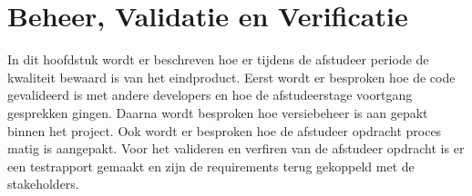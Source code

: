 \chapter{Beheer, Validatie en Verificatie}
In dit hoofdstuk wordt er beschreven hoe er tijdens de afstudeer periode de kwaliteit bewaard is van het eindproduct.
Eerst wordt er besproken hoe de code gevalideerd is met andere developers en hoe de afstudeerstage voortgang gesprekken gingen.
Daarna wordt besproken hoe versiebeheer is aan gepakt binnen het project.
Ook wordt er besproken hoe de afstudeer opdracht proces matig is aangepakt.
Voor het valideren en verfiren van de afstudeer opdracht is er een testrapport gemaakt en zijn de requirements terug gekoppeld met de stakeholders.





